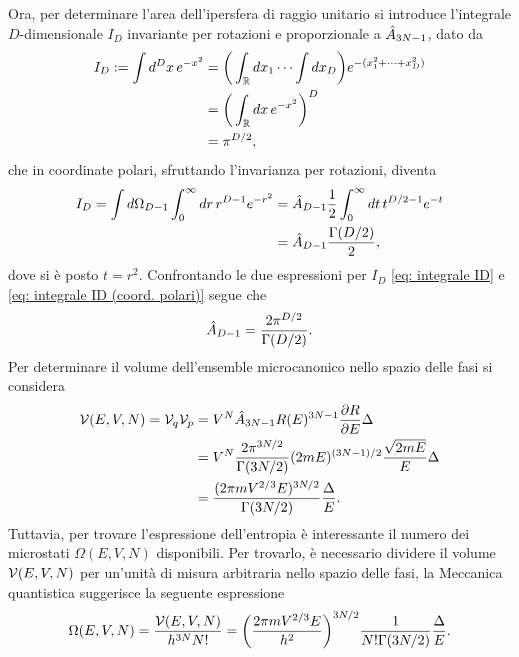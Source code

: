 Ora, per determinare l'area dell'ipersfera di raggio unitario si introduce l'integrale $D$-dimensionale $I_D$ invariante per rotazioni e proporzionale a $\hat{A}_{3N-1}$, dato da
\begin{equation}
\label{eq: integrale ID}
    \begin{split}
        I_D := \int d^Dx\,e^{-x^2} &= \bigg(\int_{\mathbb{R}} dx_1\cdots\int dx_D\bigg)e^{-(x_1^2 + \cdots + x_D^2)} \\
        &= \bigg(\int_{\mathbb{R}} dx\,e^{-x^2}\bigg)^D \\
        &= \pi^{D/2},
    \end{split}
\end{equation}
che in coordinate polari, sfruttando l'invarianza per rotazioni, diventa
\begin{equation}
\label{eq: integrale ID (coord. polari)}
    \begin{split}
        I_D = \int d\Omega_{D-1}\int_0^\infty dr\,r^{D-1}e^{-r^2} &= \hat{A}_{D-1}\frac{1}{2}\int_0^\infty dt\,t^{D/2 - 1}e^{-t} \\
        &= \hat{A}_{D-1}\frac{\Gamma(D/2)}{2},
    \end{split}
\end{equation}
dove si è posto $t = r^2$. Confrontando le due espressioni per $I_D$ \eqref{eq: integrale ID} e \eqref{eq: integrale ID (coord. polari)} segue che
\begin{equation}
    \hat{A}_{D-1} = \frac{2\pi^{D/2}}{\Gamma(D/2)}.
\end{equation}
Per determinare il volume dell'ensemble microcanonico nello spazio delle fasi si considera
\begin{equation}
    \begin{split}
        \mathcal{V}(E,V,N) = \mathcal{V}_q\mathcal{V}_p &= V^N\hat{A}_{3N-1}R(E)^{3N-1}\frac{\partial R}{\partial E}\Delta \\
        &= V^N\frac{2\pi^{3N/2}}{\Gamma(3N/2)}(2mE)^{(3N-1)/2}\frac{\sqrt{2mE}}{E}\Delta \\
        &= \frac{(2\pi mV^{2/3}E)^{3N/2}}{\Gamma(3N/2)}\frac{\Delta}{E}.
    \end{split}
\end{equation}
Tuttavia, per trovare l'espressione dell'entropia è interessante il numero dei microstati $\Omega(E,V,N)$ disponibili. Per trovarlo, è necessario dividere il volume $\mathcal{V}(E,V,N)$ per un'unità di misura arbitraria nello spazio delle fasi, la Meccanica quantistica suggerisce la seguente espressione
\begin{equation}
\label{eq: microstati complessivi gas ideale (microcanonico)}
    \Omega(E,V,N) = \frac{\mathcal{V}(E,V,N)}{h^{3N}N!} = \bigg(\frac{2\pi m V^{2/3}E}{h^2}\bigg)^{3N/2}\frac{1}{N!\Gamma(3N/2)}\frac{\Delta}{E}.
\end{equation}
